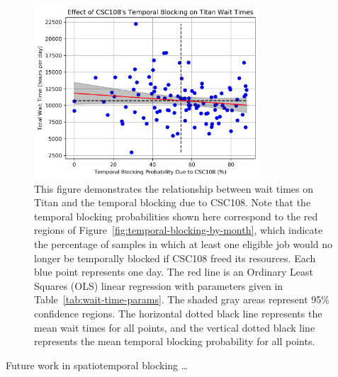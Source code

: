 \begin{figure}
  \includegraphics[width=0.75\textwidth]{images/linfit-wait-time-vs-csc108-temporal.png}
\caption{This figure demonstrates the relationship between wait times on Titan
and the temporal blocking due to CSC108. Note that the temporal blocking
probabilities shown here correspond to the red regions of
Figure~\ref{fig:temporal-blocking-by-month}, which indicate the percentage of
samples in which at least one eligible job would no longer be temporally
blocked  if CSC108 freed its resources. Each blue point represents one day. The
red line is an Ordinary Least Squares (OLS) linear regression with parameters
given in Table~\ref{tab:wait-time-params}. The shaded gray areas represent 95\%
confidence regions. The horizontal dotted black line represents the mean wait
times for all points, and the vertical dotted black line represents the mean
temporal blocking probability for all points.}
\label{fig:wait-time-spatial-csc108}
\end{figure}








Future work in spatiotemporal blocking \ldots

%
%
%
%

